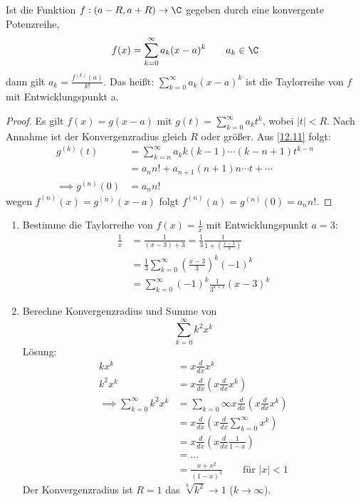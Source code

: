 \documentclass[a4paper,10pt]{scrartcl}
\begin{document}
\begin{kor}
\label{12.12}
Ist die Funktion $f:(a-R,a+R)\to \C$ gegeben durch eine konvergente Potenzreihe,
\[
f(x)=\sum_{k=0}^\infty a_k(x-a)^k \qquad a_k\in\C
\]
dann gilt $a_k=\frac{f^{(k)}(a)}{k!}$.
Das heißt: $\sum_{k=0}^\infty a_k(x-a)^k$ ist die Taylorreihe von $f$ mit Entwicklungspunkt a.
\begin{proof}
Es gilt $f(x)=g(x-a)$ mit $g(t)=\sum_{k=0}^\infty a_kt^k$, wobei $|t|<R$.
Nach Annahme ist der Konvergenzradius gleich $R$ oder größer.
Aus \ref{12.11} folgt:
\begin{align*}
g^{(k)}(t)&=\sum_{k=n}^\infty a_kk(k-1)\dotsb(k-n+1)t^{k-n}\\
&=a_nn!+a_{n+1}(n+1)n\dotsb t + \dotsb\\
\implies g^{(n)}(0)&=a_nn!
\end{align*}
wegen $f^{(n)}(x)=g^{(n)}(x-a)$ folgt $f^{(n)}(a)=g^{(n)}(0)=a_nn!$.
\end{proof}
\begin{ex*}
\begin{enumerate}
\item Bestimme die Taylorreihe von $f(x)=\frac 1x$ mit Entwicklungspunkt $a=3$:
\begin{align*}
\frac 1x&=\frac 1{(x-3)+3}=\frac 13 \frac 1{1+\left(\frac {x-3}3\right)}\\
&=\frac 13 \sum_{k=0}^\infty\left(\frac {x-3}3\right)^k(-1)^k\\
&=\sum_{k=0}^\infty(-1)^k\frac 1{3^{k+1}}(x-3)^k
\end{align*}
\item Berechne Konvergenzradius und Summe von
\[
\sum_{k=0}^\infty k^2x^k
\]
Lösung:
\begin{align*}
kx^k &= x\frac d{dx}x^k\\
k^2x^k &= x \frac d{dx}\left(x\frac d{dx}x^k\right)\\
\implies \sum_{k=0}^\infty k^2x^k &= \sum_{k=0}\infty x\frac d{dx}\left(x\frac d{dx}x^k\right)\\
&= x\frac d{dx}\left(x\frac d{dx}\sum_{k=0}^\infty x^k\right)\\
&= x\frac d{dx}\left(x\frac d{dx}\frac 1{1-x}\right)\\
&= …\\
&= \frac {x+x^2}{(1-x)^3} \qquad \text{für } |x|<1
\end{align*}
Der Konvergenzradius ist $R=1$ das $\sqrt[k]{k^2}\to 1$ ($k\to \infty$).
\end{enumerate}
\end{ex*}
\end{kor}
\end{document}
